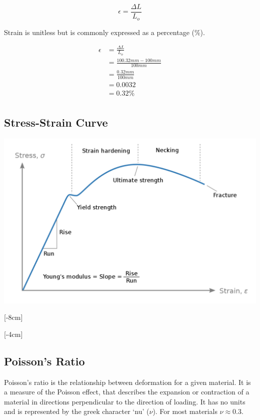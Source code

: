 \documentclass[12pt]{article}
\begin{document}
\begin{equation*}
  \epsilon = \frac{\Delta L}{L_o} 
\end{equation*}  

Strain is unitless but is commonly expressed as a percentage (\%).

\begin{example}
  \begin{align*}
    \epsilon &= \frac{\Delta L}{L_o} \\
             &= \frac{100.32\unit{mm}-100\unit{mm}}{100\unit{mm}} \\ 
            &= \frac{0.32\unit{mm}}{100\unit{mm}} \\ 
            &= 0.0032 \\
            &= 0.32\% \\ 
  \end{align*}
\end{example}

\subsection{Stress-Strain Curve}
\includegraphics[scale=0.3]{stressvsstrain}

[-8cm]

[-4cm]

\subsection{Poisson's Ratio}
Poisson's ratio is the relationship between deformation for a given material. 
It is a measure of the Poisson effect, that describes the expansion or contraction of a material in directions perpendicular to the direction of loading. 
It has no units and is represented by the greek character `nu' ($\nu$).
For most materials $\nu \approx 0.3$.
\end{document}

